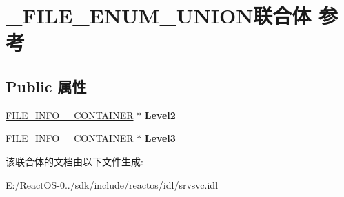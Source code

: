 \hypertarget{union___f_i_l_e___e_n_u_m___u_n_i_o_n}{}\section{\+\_\+\+F\+I\+L\+E\+\_\+\+E\+N\+U\+M\+\_\+\+U\+N\+I\+O\+N联合体 参考}
\label{union___f_i_l_e___e_n_u_m___u_n_i_o_n}
\subsection*{Public 属性}
\begin{DoxyCompactItemize}
\item 
\mbox{\label{union___f_i_l_e___e_n_u_m___u_n_i_o_n_a176df695f361e537c9e7e277686bdcb5}} 
\hyperlink{struct___f_i_l_e___i_n_f_o__2___c_o_n_t_a_i_n_e_r}{F\+I\+L\+E\+\_\+\+I\+N\+F\+O\+\_\+\_\+\+C\+O\+N\+T\+A\+I\+N\+ER} $\ast$ {\bfseries Level2}
\item 
\mbox{\label{union___f_i_l_e___e_n_u_m___u_n_i_o_n_adbc1e214da185dc293062e9e11f83e3b}} 
\hyperlink{struct___f_i_l_e___i_n_f_o__3___c_o_n_t_a_i_n_e_r}{F\+I\+L\+E\+\_\+\+I\+N\+F\+O\+\_\+\_\+\+C\+O\+N\+T\+A\+I\+N\+ER} $\ast$ {\bfseries Level3}
\end{DoxyCompactItemize}


该联合体的文档由以下文件生成\+:\begin{DoxyCompactItemize}
\item 
E\+:/\+React\+O\+S-\/0../sdk/include/reactos/idl/srvsvc.\+idl\end{DoxyCompactItemize}
